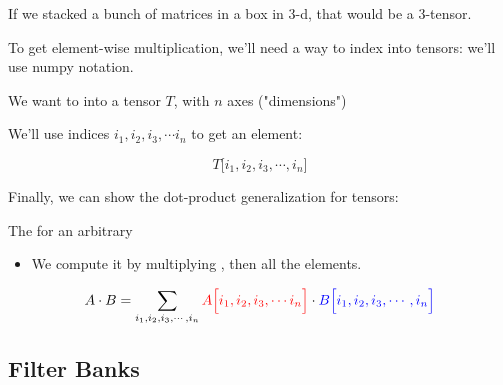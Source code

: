         \miniex If we stacked a bunch of matrices in a box in 3-d, that would be a 3-tensor.

        To get element-wise multiplication, we'll need a way to index into tensors: we'll use numpy notation.\\

        \begin{notation}
            We want to  into a tensor $T$, with $n$ axes ("dimensions")
            
            We'll use indices $i_1,i_2,i_3, \cdots i_n$ to get an element:

            \begin{equation*}
                T \Big[ i_1,i_2,i_3, \cdots, i_n \Big]
            \end{equation*}
            
        \end{notation}

        Finally, we can show the dot-product generalization for tensors:
            \\

        \begin{definition}
            The  for an arbitrary 

            \begin{itemize}
                \item We compute it by multiplying , then  all the elements.
            \end{itemize}
            

            \subsecdiv

            \begin{equation*}
                A \cdot B = \sum_{i_1,i_2,i_3, \cdots, i_n} 
                \textcolor{red}{A \Big[i_1,i_2,i_3, \cdots i_n  \Big]} \cdot 
                \textcolor{blue}{B \Big[i_1,i_2,i_3, \cdots, i_n \Big]}
            \end{equation*}
        \end{definition}


    \pagebreak 

    \subsection{Filter Banks}

